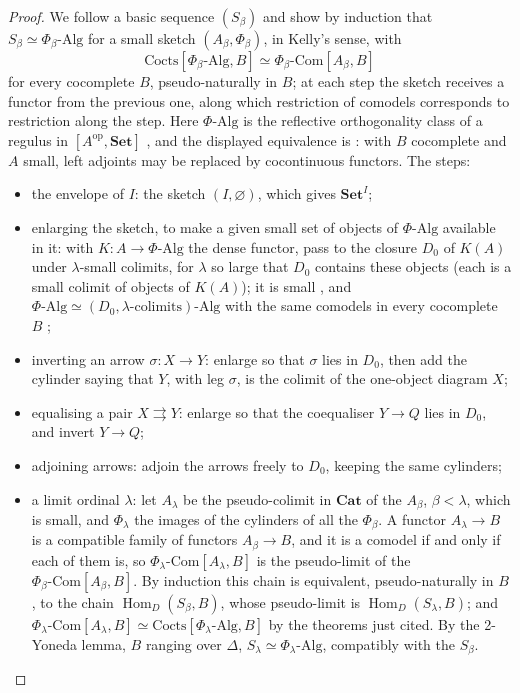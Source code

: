 \documentclass[11pt,a4paper]{amsart}
\theoremstyle{definition}
\theoremstyle{remark}
\newcommand{\Set}{\mathbf{Set}}
\newcommand{\Cat}{\mathbf{Cat}}
\newcommand{\Hom}{\operatorname{Hom}}
\begin{document}
\begin{proof}
We follow a basic sequence $(S_\beta)$ and show by induction that $S_\beta\simeq\Phi_\beta\text{-}\mathrm{Alg}$ for a small sketch $(A_\beta,\Phi_\beta)$, in Kelly's sense, with
\[\mathrm{Cocts}[\Phi_\beta\text{-}\mathrm{Alg},B]\simeq\Phi_\beta\text{-}\mathrm{Com}[A_\beta,B]\]
for every cocomplete $B$, pseudo-naturally in $B$; at each step the sketch receives a functor from the previous one, along which restriction of comodels corresponds to restriction along the step. Here $\Phi\text{-}\mathrm{Alg}$ is the reflective orthogonality class of a regulus in $[A^{\mathrm{op}},\Set]$ \cite[Thm~6.5, Thm~6.11]{kellybook}, and the displayed equivalence is \cite[Thm~5.56]{kellybook}: with $B$ cocomplete and $A$ small, left adjoints may be replaced by cocontinuous functors. The steps:
\begin{itemize}
\item the envelope of $I$: the sketch $(I,\varnothing)$, which gives $\Set^I$;
\item enlarging the sketch, to make a given small set of objects of $\Phi\text{-}\mathrm{Alg}$ available in it: with $K\colon A\to\Phi\text{-}\mathrm{Alg}$ the dense functor, pass to the closure $D_0$ of $K(A)$ under $\lambda$-small colimits, for $\lambda$ so large that $D_0$ contains these objects (each is a small colimit of objects of $K(A)$); it is small \cite[\S3.5]{kellybook}, and $\Phi\text{-}\mathrm{Alg}\simeq(D_0,\lambda\text{-colimits})\text{-}\mathrm{Alg}$ with the same comodels in every cocomplete $B$ \cite[Prop.~6.21, Cor.~6.22, Thm~6.23]{kellybook};
\item inverting an arrow $\sigma\colon X\to Y$: enlarge so that $\sigma$ lies in $D_0$, then add the cylinder saying that $Y$, with leg $\sigma$, is the colimit of the one-object diagram $X$;
\item equalising a pair $X\rightrightarrows Y$: enlarge so that the coequaliser $Y\to Q$ lies in $D_0$, and invert $Y\to Q$;
\item adjoining arrows: adjoin the arrows freely to $D_0$, keeping the same cylinders;
\item a limit ordinal $\lambda$: let $A_\lambda$ be the pseudo-colimit in $\Cat$ of the $A_\beta$, $\beta<\lambda$, which is small, and $\Phi_\lambda$ the images of the cylinders of all the $\Phi_\beta$. A functor $A_\lambda\to B$ is a compatible family of functors $A_\beta\to B$, and it is a comodel if and only if each of them is, so $\Phi_\lambda\text{-}\mathrm{Com}[A_\lambda,B]$ is the pseudo-limit of the $\Phi_\beta\text{-}\mathrm{Com}[A_\beta,B]$. By induction this chain is equivalent, pseudo-naturally in $B$, to the chain $\Hom_D(S_\beta,B)$, whose pseudo-limit is $\Hom_D(S_\lambda,B)$; and $\Phi_\lambda\text{-}\mathrm{Com}[A_\lambda,B]\simeq\mathrm{Cocts}[\Phi_\lambda\text{-}\mathrm{Alg},B]$ by the theorems just cited. By the 2-Yoneda lemma, $B$ ranging over $\Delta$, $S_\lambda\simeq\Phi_\lambda\text{-}\mathrm{Alg}$, compatibly with the $S_\beta$.

\end{itemize}
\end{proof}
\end{document}
